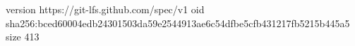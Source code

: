 version https://git-lfs.github.com/spec/v1
oid sha256:bced60004edb24301503da59e2544913ae6c54dfbe5cfb431217fb5215b445a5
size 413
